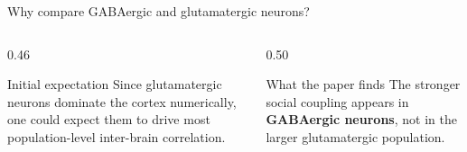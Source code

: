 \documentclass[aspectratio=169,11pt]{beamer}
\begin{document}
\begin{frame}{Why compare GABAergic and glutamatergic neurons?}
\begin{columns}[T]
  \begin{column}{0.46\textwidth}
    \begin{block}{Initial expectation}
    Since glutamatergic neurons dominate the cortex numerically, one could expect them to drive most population-level inter-brain correlation.
    \end{block}
  \end{column}
  \begin{column}{0.50\textwidth}
    \begin{alertblock}{What the paper finds}
    The stronger social coupling appears in \textbf{GABAergic neurons}, not in the larger glutamatergic population.
    \end{alertblock}
  \end{column}
\end{columns}
\vspace{0.4em}
\begin{center}
\end{center}
\end{frame}
\end{document}

